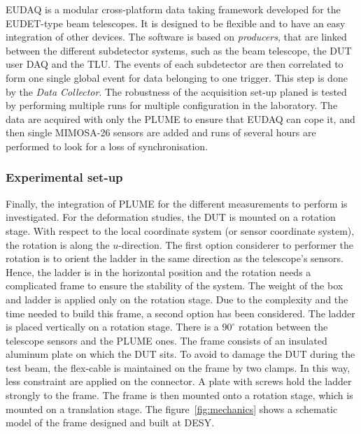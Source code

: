       EUDAQ is a modular cross-platform data taking framework developed for the EUDET-type beam telescopes\cite{Jansen}.
      It is designed to be flexible and to have an easy integration of other devices.
      The software is based on \textit{producers}, that are linked between the different subdetector systems, such as the beam telescope, the \gls{DUT} user DAQ and the \gls{TLU}\cite{Cussans2009}.
      The events of each subdetector are then correlated to form one single global event for data belonging to one trigger.
      This step is done by the \textit{Data Collector}.
      The robustness of the acquisition set-up planed is tested by performing multiple runs for multiple configuration in the laboratory.
      The data are acquired with only the \gls{PLUME} to ensure that EUDAQ can cope it, and then single \gls{MIMOSA}-26 sensors are added and runs of several hours are performed to look for a loss of synchronisation.

      \subsubsection{Experimental set-up}

      Finally, the integration of \gls{PLUME} for the different measurements to perform is investigated.
      For the deformation studies, the \gls{DUT} is mounted on a rotation stage. 
      With respect to the local coordinate system (or sensor coordinate system), the rotation is along the $u$-direction. 
      The first option considerer to performer the rotation is to orient the ladder in the same direction as the telescope's sensors. 
      Hence, the ladder is in the horizontal position and the rotation needs a complicated frame to ensure the stability of the system.
      The weight of the box and ladder is applied only on the rotation stage. 
      Due to the complexity and the time needed to build this frame, a second option has been considered.
      The ladder is placed vertically on a rotation stage. 
      There is a $90^{\circ}$ rotation between the telescope sensors and the \gls{PLUME} ones.
      The frame consists of an insulated aluminum plate on which the \gls{DUT} sits.
      To avoid to damage the \gls{DUT} during the test beam, the flex-cable is maintained on the frame by two clamps.
      In this way, less constraint are applied on the connector. 
      A plate with screws hold the ladder strongly to the frame.
      The frame is then mounted onto a rotation stage, which is mounted on a translation stage.
      The figure~\ref{fig:mechanics} shows a schematic model of the frame designed and built at DESY.
      
